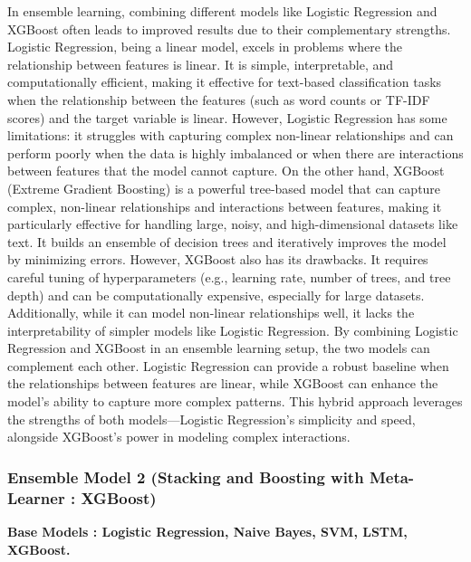 \noindent
In ensemble learning, combining different models like Logistic Regression and XGBoost often leads to improved results due to their complementary strengths. Logistic Regression, being a linear model, excels in problems where the relationship between features is linear. It is simple, interpretable, and computationally efficient, making it effective for text-based classification tasks when the relationship between the features (such as word counts or TF-IDF scores) and the target variable is linear. However, Logistic Regression has some limitations: it struggles with capturing complex non-linear relationships and can perform poorly when the data is highly imbalanced or when there are interactions between features that the model cannot capture. On the other hand, XGBoost (Extreme Gradient Boosting) is a powerful tree-based model that can capture complex, non-linear relationships and interactions between features, making it particularly effective for handling large, noisy, and high-dimensional datasets like text. It builds an ensemble of decision trees and iteratively improves the model by minimizing errors. However, XGBoost also has its drawbacks. It requires careful tuning of hyperparameters (e.g., learning rate, number of trees, and tree depth) and can be computationally expensive, especially for large datasets. Additionally, while it can model non-linear relationships well, it lacks the interpretability of simpler models like Logistic Regression. By combining Logistic Regression and XGBoost in an ensemble learning setup, the two models can complement each other. Logistic Regression can provide a robust baseline when the relationships between features are linear, while XGBoost can enhance the model's ability to capture more complex patterns. This hybrid approach leverages the strengths of both models—Logistic Regression's simplicity and speed, alongside XGBoost's power in modeling complex interactions.

\pagebreak
\subsubsection{Ensemble Model 2 (Stacking and Boosting with Meta-Learner : XGBoost)}
\noindent
\textbf{Base Models : Logistic Regression, Naive Bayes, SVM, LSTM, XGBoost.}

